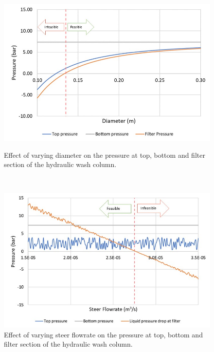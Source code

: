 \begin{figure}[h]
    \centering
    \begin{minipage}[t]{0.5\textwidth}
        \centering
        \includegraphics[width=\linewidth]{chapters/3-separation/figures/diameter.jpg}
        \caption{Effect of varying diameter on the pressure at top, bottom and filter section of the hydraulic wash column.} 
        \label{fig:dia_col}
        \end{minipage}%
    ~ 
    \begin{minipage}[t]{0.5\textwidth}
        \centering
        \includegraphics[width=\linewidth]{chapters/3-separation/figures/steerflow.jpg}
        \caption{Effect of varying steer flowrate on the pressure at top, bottom and filter section of the hydraulic wash column.}
    \label{fig:steer}   
    \end{minipage}

\end{figure}

